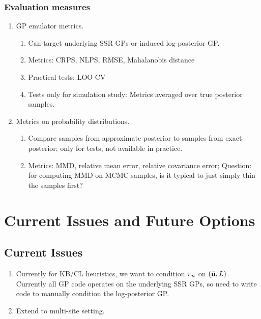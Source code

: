 \documentclass[12pt]{article}
\begin{document}
\begin{enumerate}
\subsubsection{Evaluation measures}
\begin{enumerate}
\item GP emulator metrics.
	\begin{enumerate}
	\item Can target underlying SSR GPs or induced log-posterior GP. 
	\item Metrics: CRPS, NLPS, RMSE, Mahalanobis distance 
	\item Practical tests: LOO-CV
	\item Tests only for simulation study: Metrics averaged over true posterior samples. 
	\end{enumerate}
\item Metrics on probability distributions. 
	\begin{enumerate}
	\item Compare samples from approximate posterior to samples from exact posterior; only for tests, not available in practice. 
	\item Metrics: MMD, relative mean error, relative covariance error; Question: for computing MMD on MCMC samples, is it typical to just simply thin the samples first? 
	\end{enumerate}
\end{enumerate}


\section{Current Issues and Future Options}

\subsection{Current Issues}
\begin{enumerate}
\item Currently for KB/CL heuristics, we want to condition ${\pi}_{n}$ on $(\tilde{\mathbf{u}}, L)$. Currently all GP code operates on the 
underlying SSR GPs, so need to write code to manually condition the log-posterior GP. 
\item Extend to multi-site setting. 
\end{enumerate}


\end{enumerate}
\end{document}
